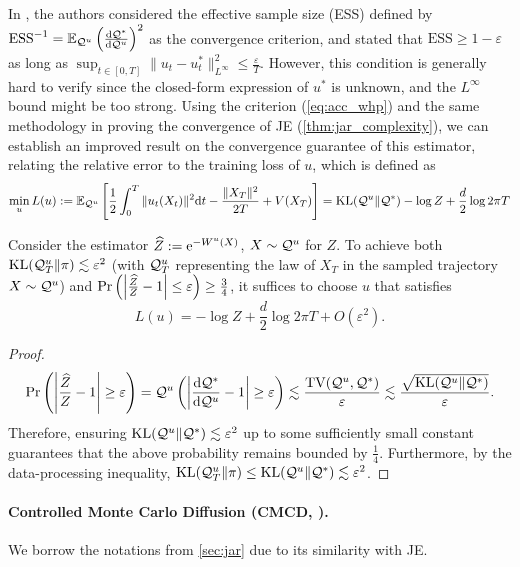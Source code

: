 In \citet[Theorem 3]{zhang2022path}, the authors considered the effective sample size (ESS) defined by $\mathrm{ESS}^{-1}=\operatorname{\mathbb{E}}_{\mathcal{Q}^u}{\left(\frac{\mathrm{d}\mathcal{Q}^*}{\mathrm{d}\mathcal{Q}^u}\right)^2}$ as the convergence criterion, and stated that $\mathrm{ESS}\ge1-\varepsilon$ as long as $\sup_{t\in[0,T]}\|u_t-u^*_t\|^2_{L^\infty}\le\frac{\varepsilon}{T}$. However, this condition is generally hard to verify since the closed-form expression of $u^*$ is unknown, and the $L^\infty$ bound might be too strong. Using the criterion (\cref{eq:acc_whp}) and the same methodology in proving the convergence of JE (\cref{thm:jar_complexity}), we can establish an improved result on the convergence guarantee of this estimator, relating the relative error to the training loss of $u$, which is defined as
$$\min_u L(u):=\operatorname{\mathbb{E}}_{\mathcal{Q}^u}\left[\frac{1}{2}\int_0^T\|u_t(X_t)\|^2\mathrm{d} t-\frac{\|X_T\|^2}{2T}+V(X_T)\right]=\operatorname{KL}(\mathcal{Q}^u\|\mathcal{Q}^*)-\log Z+\frac{d}{2}\log2\pi T$$
\begin{proposition}
    \label{thm:pis_complexity}
    Consider the estimator $\widehat{Z}:=\mathrm{e}^{-W^u(X)}$, $X\sim\mathcal{Q}^u$ for $Z$. To achieve both $\operatorname{KL}(\mathcal{Q}^u_T\|\pi)\lesssim\varepsilon^2$ (with $\mathcal{Q}^u_T$ representing the law of $X_T$ in the sampled trajectory $X\sim\mathcal{Q}^u$) and $\operatorname{Pr}\left(\left|\frac{\widehat{Z}}{Z}-1\right|\le\varepsilon\right)\ge\frac{3}{4}$, it suffices to choose $u$ that satisfies
    $$L(u)=-\log Z+\frac{d}{2}\log2\pi T+O(\varepsilon^2).$$
\end{proposition}

\begin{proof}
    \begin{align*}
        \operatorname{Pr}\left(\left|\frac{\widehat{Z}}{Z}-1\right|\ge\varepsilon\right)=\mathcal{Q}^u\left(\left|\frac{\mathrm{d}\mathcal{Q}^*}{\mathrm{d}\mathcal{Q}^u}-1\right|\ge\varepsilon\right)              \lesssim\frac{\operatorname{TV}(\mathcal{Q}^u,\mathcal{Q}^*)}{\varepsilon}\lesssim\frac{\sqrt{\operatorname{KL}(\mathcal{Q}^u\|\mathcal{Q}^*)}}{\varepsilon}.
    \end{align*}
    Therefore, ensuring $\operatorname{KL}(\mathcal{Q}^u\|\mathcal{Q}^*)\lesssim\varepsilon^2$ up to some sufficiently small constant guarantees that the above probability remains bounded by $\frac{1}{4}$. Furthermore, by the data-processing inequality, $\operatorname{KL}(\mathcal{Q}^u_T\|\pi)\le\operatorname{KL}(\mathcal{Q}^u\|\mathcal{Q}^*)\lesssim\varepsilon^2$.
\end{proof}

\paragraph{Controlled Monte Carlo Diffusion (CMCD, \citet{vargas2024transport}).} We borrow the notations from \cref{sec:jar} due to its similarity with JE.

